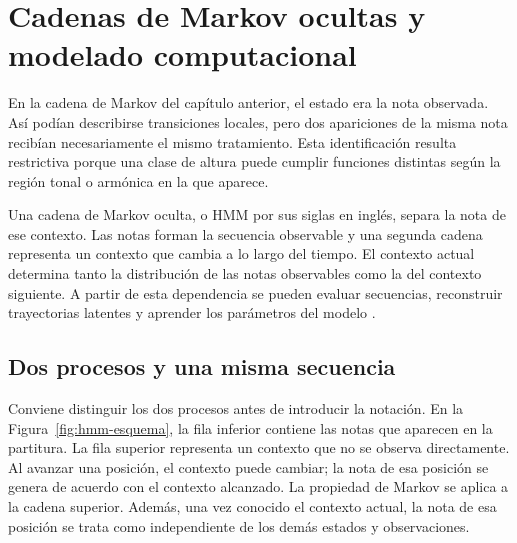 \chapter{Cadenas de Markov ocultas y modelado computacional}
\label{chap:hmm}

En la cadena de Markov del capítulo anterior, el estado era la nota observada. Así podían describirse transiciones locales, pero dos apariciones de la misma nota recibían necesariamente el mismo tratamiento. Esta identificación resulta restrictiva porque una clase de altura puede cumplir funciones distintas según la región tonal o armónica en la que aparece.

Una cadena de Markov oculta, o HMM por sus siglas en inglés, separa la nota de ese contexto. Las notas forman la secuencia observable y una segunda cadena representa un contexto que cambia a lo largo del tiempo. El contexto actual determina tanto la distribución de las notas observables como la del contexto siguiente. A partir de esta dependencia se pueden evaluar secuencias, reconstruir trayectorias latentes y aprender los parámetros del modelo \cite{rabiner1989,cappe2005}.

\section{Dos procesos y una misma secuencia}

Conviene distinguir los dos procesos antes de introducir la notación. En la Figura~\ref{fig:hmm-esquema}, la fila inferior contiene las notas que aparecen en la partitura. La fila superior representa un contexto que no se observa directamente. Al avanzar una posición, el contexto puede cambiar; la nota de esa posición se genera de acuerdo con el contexto alcanzado. La propiedad de Markov se aplica a la cadena superior. Además, una vez conocido el contexto actual, la nota de esa posición se trata como independiente de los demás estados y observaciones.

